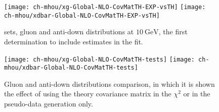 \begin{figure}
	\centering
	\texttt{[image: ch-mhou/xg-Global-NLO-CovMatTH-EXP-vsTH]}
	\texttt{[image: ch-mhou/xdbar-Global-NLO-CovMatTH-EXP-vsTH]}
	\caption{
		 \nlo sets, gluon and anti-down distributions at
		$\SI{10}{\giga\electronvolt}$, the first \pdf determination to include
		\mhou estimates in the fit.
	}
	\label{fig:mhou/3.1th}
\end{figure}

\begin{figure}
	\centering
	\texttt{[image: ch-mhou/xg-Global-NLO-CovMatTH-tests]}
	\texttt{[image: ch-mhou/xdbar-Global-NLO-CovMatTH-tests]}
	\caption{
		Gluon and anti-down distributions comparison, in which it is shown the
		effect of using the theory covariance matrix in the $\chi^2$ or in the
		pseudo-data generation only.
	}
	\label{fig:mhou/3.1th-tests}
\end{figure}
